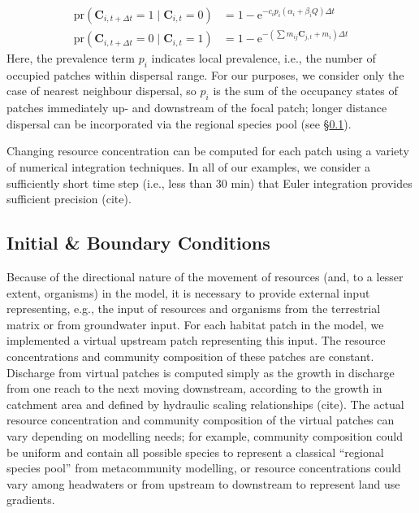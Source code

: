 \begin{equation}
\begin{split}
	\mathrm{pr}\left( \mathbf{C}_{i, t+\Delta t} = 1 \mid \mathbf{C}_{i, t} = 0\right) &= 
			1 - \mathrm{e}^{-c_i p_i(\alpha_i + \beta_iQ) \Delta t} \\
	\mathrm{pr}\left( \mathbf{C}_{i, t+\Delta t} = 0 \mid \mathbf{C}_{i, t} = 1\right) &= 
			1 - \mathrm{e}^{-\left( \sum{m_{ij}\mathbf{C}_{j, t}} + m_i \right)\Delta t}
	\label{eq:ceprob}
\end{split}
\end{equation}
Here, the prevalence term $p_i$ indicates local prevalence, i.e., the number of occupied patches within dispersal range.
For our purposes, we consider only the case of nearest neighbour dispersal, so $p_i$ is the sum of the occupancy states of patches immediately up- and downstream of the focal patch; longer distance dispersal can be incorporated via the regional species pool (see §\ref{ss:initial-boundary}).

Changing resource concentration can be computed for each patch using a variety of numerical integration techniques.
In all of our examples, we consider a sufficiently short time step (i.e., less than 30 min) that Euler integration provides sufficient precision (cite).

\subsection{Initial \& Boundary Conditions} \label{ss:initial-boundary}

Because of the directional nature of the movement of resources (and, to a lesser extent, organisms) in the model, it is necessary to provide external input representing, e.g., the input of resources and organisms from the terrestrial matrix or from groundwater input.
For each habitat patch in the model, we implemented a virtual upstream patch representing this input.
The resource concentrations and community composition of these patches are constant.
Discharge from virtual patches is computed simply as the growth in discharge from one reach to the next moving downstream, according to the growth in catchment area and defined by hydraulic scaling relationships (cite).
The actual resource concentration and community composition of the virtual patches can vary depending on modelling needs; for example, community composition could be uniform and contain all possible species to represent a classical “regional species pool” from metacommunity modelling, or resource concentrations could vary among headwaters or from upstream to downstream to represent land use gradients.


